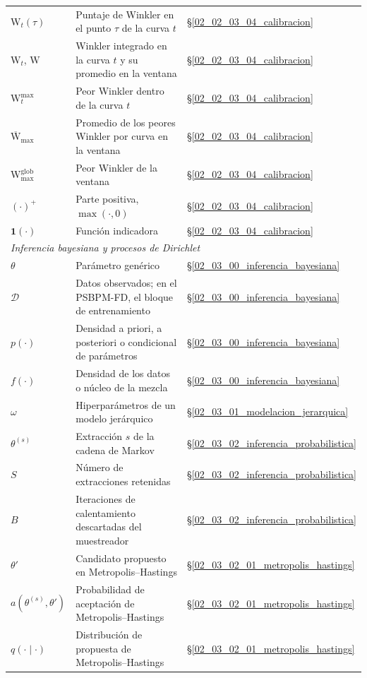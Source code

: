 \begin{longtable}{p{} p{} p{}}
$\mathrm{W}_t(\tau)$ & Puntaje de Winkler en el punto $\tau$ de la curva $t$ & \S\ref{02_02_03_04_calibracion} \\
$\mathrm{W}_t$, $\mathrm{W}$ & Winkler integrado en la curva $t$ y su promedio en la ventana & \S\ref{02_02_03_04_calibracion} \\
$\mathrm{W}_t^{\max}$ & Peor Winkler dentro de la curva $t$ & \S\ref{02_02_03_04_calibracion} \\
$\overline{\mathrm{W}}_{\max}$ & Promedio de los peores Winkler por curva en la ventana & \S\ref{02_02_03_04_calibracion} \\
$\mathrm{W}_{\max}^{\mathrm{glob}}$ & Peor Winkler de la ventana & \S\ref{02_02_03_04_calibracion} \\
$(\cdot)^{+}$ & Parte positiva, $\max(\cdot, 0)$ & \S\ref{02_02_03_04_calibracion} \\
$\mathbf{1}(\cdot)$ & Función indicadora & \S\ref{02_02_03_04_calibracion} \\
\hline
\multicolumn{3}{l}{\textit{Inferencia bayesiana y procesos de Dirichlet}} \\
\hline
$\theta$ & Parámetro genérico & \S\ref{02_03_00_inferencia_bayesiana} \\
$\mathcal{D}$ & Datos observados; en el PSBPM-FD, el bloque de entrenamiento & \S\ref{02_03_00_inferencia_bayesiana} \\
$p(\cdot)$ & Densidad a priori, a posteriori o condicional de parámetros & \S\ref{02_03_00_inferencia_bayesiana} \\
$f(\cdot)$ & Densidad de los datos o núcleo de la mezcla & \S\ref{02_03_00_inferencia_bayesiana} \\
$\omega$ & Hiperparámetros de un modelo jerárquico & \S\ref{02_03_01_modelacion_jerarquica} \\
$\theta^{(s)}$ & Extracción $s$ de la cadena de Markov & \S\ref{02_03_02_inferencia_probabilistica} \\
$S$ & Número de extracciones retenidas & \S\ref{02_03_02_inferencia_probabilistica} \\
$B$ & Iteraciones de calentamiento descartadas del muestreador & \S\ref{02_03_02_inferencia_probabilistica} \\
$\theta'$ & Candidato propuesto en Metropolis--Hastings & \S\ref{02_03_02_01_metropolis_hastings} \\
$a(\theta^{(s)}, \theta')$ & Probabilidad de aceptación de Metropolis--Hastings & \S\ref{02_03_02_01_metropolis_hastings} \\
$q(\cdot \mid \cdot)$ & Distribución de propuesta de Metropolis--Hastings & \S\ref{02_03_02_01_metropolis_hastings} \\

\end{longtable}
